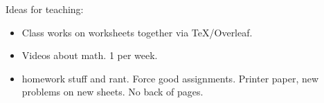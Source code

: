 \documentclass[12pt]{amsbook}
\begin{document}
Ideas for teaching:
\begin{itemize}
    \item Class works on worksheets together via TeX/Overleaf.
    \item Videos about math. 1 per week.
    \item homework stuff and rant. Force good assignments. Printer paper, new problems on new sheets. No back of pages.
\end{itemize}
\end{document}
